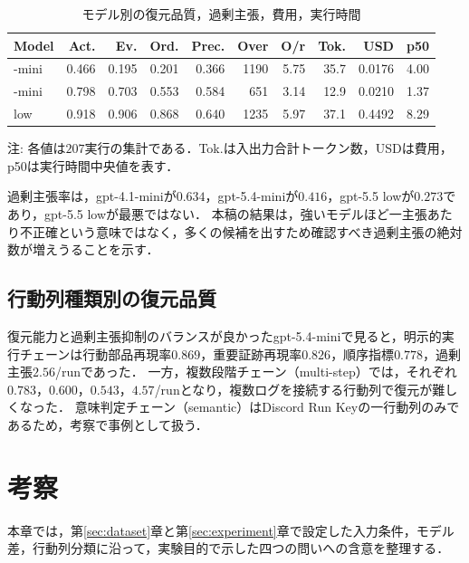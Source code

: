 \documentclass[a4paper,twocolumn,10pt]{article}
\newcommand{\code}[1]{{\small\ttfamily #1}}
\begin{document}
\begin{table}[t]
\centering
\scriptsize
\caption{モデル別の復元品質，過剰主張，費用，実行時間}
\label{tab:overall}
\setlength{\tabcolsep}{0pt}
\begin{tabular*}{\linewidth}{@{\extracolsep{\fill}}lrrrrrrrrr@{}}
\toprule
Model & Act. & Ev. & Ord. & Prec. & Over & O/r & Tok. & USD & p50 \\
\midrule
\code{4.1-mini} & 0.466 & 0.195 & 0.201 & 0.366 & 1190 & 5.75 & 35.7 & 0.0176 & 4.00 \\
\code{5.4-mini} & 0.798 & 0.703 & 0.553 & 0.584 & 651 & 3.14 & 12.9 & 0.0210 & 1.37 \\
\midrule
\code{5.5 low} & 0.918 & 0.906 & 0.868 & 0.640 & 1235 & 5.97 & 37.1 & 0.4492 & 8.29 \\
\bottomrule
\end{tabular*}
\par\raggedright\scriptsize 注: 各値は\(207\)実行の集計である．Tok.は入出力合計トークン数，USDは費用，p50は実行時間中央値を表す．
\end{table}

過剰主張率は，\code{gpt-4.1-mini}が\(0.634\)，\code{gpt-5.4-mini}が\(0.416\)，\code{gpt-5.5 low}が\(0.273\)であり，\code{gpt-5.5 low}が最悪ではない．
本稿の結果は，強いモデルほど一主張あたり不正確という意味ではなく，多くの候補を出すため確認すべき過剰主張の絶対数が増えうることを示す．

\subsection{行動列種類別の復元品質}

復元能力と過剰主張抑制のバランスが良かった\code{gpt-5.4-mini}で見ると，明示的実行チェーンは行動部品再現率\(0.869\)，重要証跡再現率\(0.826\)，順序指標\(0.778\)，過剰主張\(2.56\)/runであった．
一方，複数段階チェーン（\code{multi-step}）では，それぞれ\(0.783\)，\(0.600\)，\(0.543\)，\(4.57\)/runとなり，複数ログを接続する行動列で復元が難しくなった．
意味判定チェーン（\code{semantic}）はDiscord Run Keyの一行動列のみであるため，考察で事例として扱う．

\section{考察}

本章では，第\ref{sec:dataset}章と第\ref{sec:experiment}章で設定した入力条件，モデル差，行動列分類に沿って，実験目的で示した四つの問いへの含意を整理する．
\end{document}
